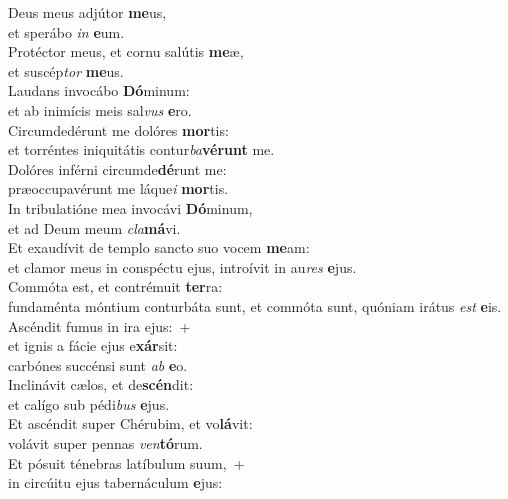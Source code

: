 \evenverse Deus meus adjútor \textbf{me}us,~\*\\
\evenverse et sperábo \textit{in} \textbf{e}um.\\
\oddverse Protéctor meus, et cornu salútis \textbf{me}æ,~\*\\
\oddverse et suscép\textit{tor} \textbf{me}us.\\
\evenverse Laudans invocábo \textbf{Dó}minum:~\*\\
\evenverse et ab inimícis meis sal\textit{vus} \textbf{e}ro.\\
\oddverse Circumdedérunt me dolóres \textbf{mor}tis:~\*\\
\oddverse et torréntes iniquitátis contur\textit{ba}\textbf{vé}\textbf{runt} me.\\
\evenverse Dolóres inférni circumde\textbf{dé}runt me:~\*\\
\evenverse præoccupavérunt me láque\textit{i} \textbf{mor}tis.\\
\oddverse In tribulatióne mea invocávi \textbf{Dó}minum,~\*\\
\oddverse et ad Deum meum \textit{cla}\textbf{má}vi.\\
\evenverse Et exaudívit de templo sancto suo vocem \textbf{me}am:~\*\\
\evenverse et clamor meus in conspéctu ejus, introívit in au\textit{res} \textbf{e}jus.\\
\oddverse Commóta est, et contrémuit \textbf{ter}ra:~\*\\
\oddverse fundaménta móntium conturbáta sunt, et commóta sunt, quóniam irátus \textit{est} \textbf{e}is.\\
\evenverse Ascéndit fumus in ira ejus:~+\\
\evenverse  et ignis a fácie ejus e\textbf{xár}sit:~\*\\
\evenverse carbónes succénsi sunt \textit{ab} \textbf{e}o.\\
\oddverse Inclinávit cælos, et de\textbf{scén}dit:~\*\\
\oddverse et calígo sub pédi\textit{bus} \textbf{e}jus.\\
\evenverse Et ascéndit super Chérubim, et vo\textbf{lá}vit:~\*\\
\evenverse volávit super pennas \textit{ven}\textbf{tó}rum.\\
\oddverse Et pósuit ténebras latíbulum suum,~+\\
\oddverse  in circúitu ejus tabernáculum \textbf{e}jus:~\*\\
